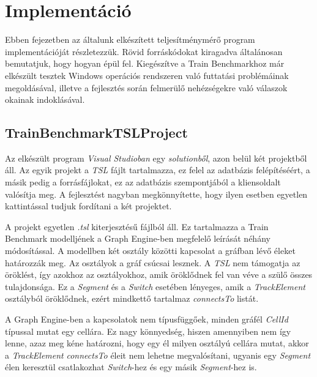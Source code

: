 \chapter{Implementáció}

Ebben fejezetben az általunk elkészített teljesítménymérő program implementációját részletezzük. Rövid forráskódokat kiragadva általánosan bemutatjuk, hogy hogyan épül fel. Kiegészítve a Train Benchmarkhoz már elkészült tesztek Windows operációs rendszeren való futtatási problémáinak megoldásával, illetve a fejlesztés során felmerülő nehézségekre való válaszok okainak indoklásával.


\section{TrainBenchmarkTSLProject}

Az elkészült program \emph{Visual Studioban} egy \emph{solutionből}, azon belül két projektből áll. Az egyik projekt a \emph{TSL} fájlt tartalmazza, ez felel az adatbázis felépítéséért, a másik pedig a \Csh{} forrásfájlokat, ez az adatbázis szempontjából a kliensoldalt valósítja meg. A fejlesztést nagyban megkönnyítette, hogy ilyen esetben egyetlen kattintással tudjuk fordítani a két projektet.

A projekt egyetlen \emph{.tsl} kiterjesztésű fájlból áll. Ez tartalmazza a Train Benchmark modelljének a Graph Engine-ben megfelelő leírását néhány módosítással. A modellben két osztály közötti kapcsolat a gráfban lévő éleket határozzák meg. Az osztályok a gráf csúcsai lesznek. A \emph{TSL} nem támogatja az öröklést, így azokhoz az osztályokhoz, amik öröklődnek fel van véve a szülő összes tulajdonsága. Ez a \emph{Segment} és a \emph{Switch} esetében lényeges, amik a \emph{TrackElement} osztályból öröklődnek, ezért mindkettő tartalmaz \emph{connectsTo} listát.

A Graph Engine-ben a kapcsolatok nem típusfüggőek, minden gráfél \emph{CellId} típussal mutat egy cellára. Ez nagy könnyedség, hiszen amennyiben nem így lenne, azaz meg kéne határozni, hogy egy él milyen osztályú cellára mutat, akkor a \emph{TrackElement} \emph{connectsTo} éleit nem lehetne megvalósítani, ugyanis egy \emph{Segment} élen keresztül csatlakozhat \emph{Switch}-hez és egy másik \emph{Segment}-hez is.

